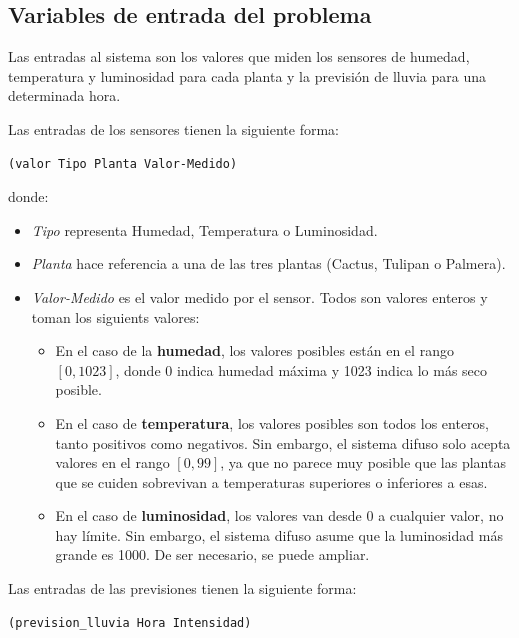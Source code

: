 \documentclass[11pt,a4paper]{article}
\begin{document}
\subsection{Variables de entrada del problema}

Las entradas al sistema son los valores que miden los sensores de humedad, temperatura y luminosidad para cada planta y la previsión
de lluvia para una determinada hora.

Las entradas de los sensores tienen la siguiente forma:

\begin{lstlisting}
(valor Tipo Planta Valor-Medido)
\end{lstlisting}

\noindent donde:

\begin{itemize}
	\item \textit{Tipo} representa Humedad, Temperatura o Luminosidad.
	\item \textit{Planta} hace referencia a una de las tres plantas (Cactus, Tulipan o Palmera).
	\item \textit{Valor-Medido} es el valor medido por el sensor. Todos son valores enteros y toman los siguients valores:
	
	\begin{itemize}
		\item En el caso de la \textbf{humedad}, los valores posibles están en el rango $[0, 1023]$, donde 0 indica humedad máxima
		y 1023 indica lo más seco posible.
		\item En el caso de \textbf{temperatura}, los valores posibles son todos los enteros, tanto positivos como negativos.
		Sin embargo, el sistema difuso solo acepta valores en el rango $[0, 99]$, ya que no parece muy posible que las plantas
		que se cuiden sobrevivan a temperaturas superiores o inferiores a esas.
		\item En el caso de \textbf{luminosidad}, los valores van desde 0 a cualquier valor, no hay límite. Sin embargo, el
		sistema difuso asume que la luminosidad más grande es 1000. De ser necesario, se puede ampliar.
	\end{itemize}
\end{itemize}

Las entradas de las previsiones tienen la siguiente forma:

\begin{lstlisting}
(prevision_lluvia Hora Intensidad)
\end{lstlisting}
\end{document}
